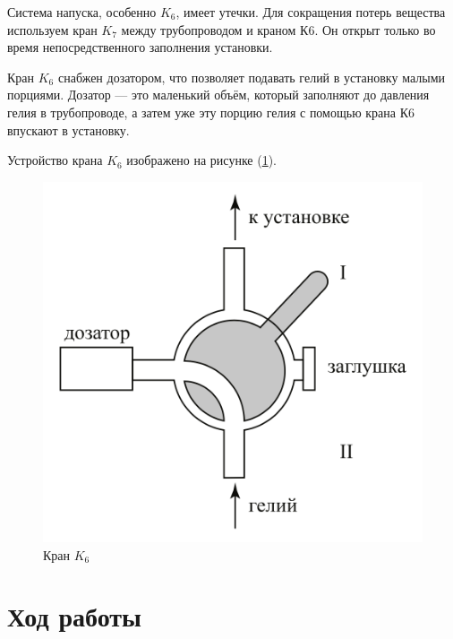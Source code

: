 \documentclass[a4paper,12pt]{article} %
\begin{document}
Система напуска, особенно $K_6$, имеет утечки. Для сокращения потерь вещества используем кран $K_7$ между трубопроводом и краном К6. Он открыт только во время непосредственного заполнения установки.


Кран $K_6$ снабжен дозатором, что позволяет подавать гелий в установку малыми порциями. Дозатор — это маленький объём, который заполняют до давления гелия в трубопроводе, а затем уже эту порцию гелия с помощью крана К6 впускают в установку. 

Устройство крана $K_6$ изображено на рисунке (\ref{fig:k6}).

\begin{figure}[h!]
  \centering
  \includegraphics[scale = 0.3]{K6.png}
  \caption{Кран $K_6$}
  \label{fig:k6}
\end{figure}


\section*{Ход работы}
\end{document}
